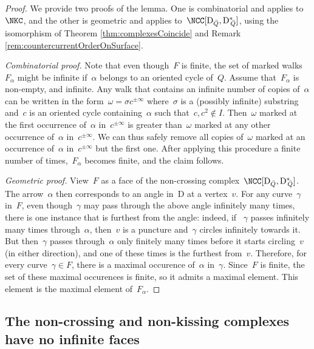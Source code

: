 \documentclass{amsart}
\theoremstyle{definition}
\newcommand{\para}[1]{\medskip\noindent\textit{#1.}} %
\newcommand{\dual}{^*} %
\newcommand{\dissection}{\mathrm{D}} %
\begin{document}
\begin{proof}
 We provide two proofs of the lemma.  One is combinatorial and applies to~$\NKC$, and the other is geometric and applies to~$\NCC[\dissection_{\bar Q}, {\dissection\dual\!\!_{\bar Q}}]$, using the isomorphism of Theorem \ref{thm:complexesCoincide} and Remark \ref{rem:countercurrentOrderOnSurface}.
 
\para{Combinatorial proof}
Note that even though~$F$ is finite, the set of marked walks~$F_\alpha$ might be infinite if~$\alpha$ belongs to an oriented cycle of~$Q$.
Assume that~$F_\alpha$ is non-empty, and infinite.
Any walk that contains an infinite number of copies of~$\alpha$ can be written in the form~$\omega=\sigma c^{\pm\infty}$ where~$\sigma$ is a (possibly infinite) substring and~$c$ is an oriented cycle containing~$\alpha$ such that~$c, c^2\notin I$.
Then~$\omega$ marked at the first occurrence of~$\alpha$ in~$c^{\pm\infty}$ is greater than~$\omega$ marked at any other occurrence of~$\alpha$ in~$c^{\pm\infty}$.
We can thus safely remove all copies of~$\omega$ marked at an occurrence of~$\alpha$ in~$c^{\pm\infty}$ but the first one.
After applying this procedure a finite number of times,~$F_\alpha$ becomes finite, and the claim follows.
 
\para{Geometric proof}
View~$F$ as a face of the non-crossing complex~$\NCC[\dissection_{\bar Q}, {\dissection\dual\!\!_{\bar Q}}]$.
The arrow~$\alpha$ then corresponds to an angle in~$\dissection$ at a vertex~$v$.  
% 
For any curve~$\gamma$ in~$F$, even though~$\gamma$ may pass through the above angle infinitely many times, there is one instance that is furthest from the angle: indeed, if ~$\gamma$ passes infinitely many times through~$\alpha$, then~$v$ is a puncture and~$\gamma$ circles infinitely towards it.
But then~$\gamma$ passes through~$\alpha$ only finitely many times before it starts circling~$v$ (in either direction), and one of these times is the furthest from~$v$.
%  
Therefore, for every curve~$\gamma\in F$, there is a maximal occurence of~$\alpha$ in~$\gamma$.
Since~$F$ is finite, the set of these maximal occurences is finite, so it admits a maximal element.  
This element is the maximal element of~$F_\alpha$.
\end{proof}

\subsection{The non-crossing and non-kissing complexes have no infinite faces}
\end{document}
